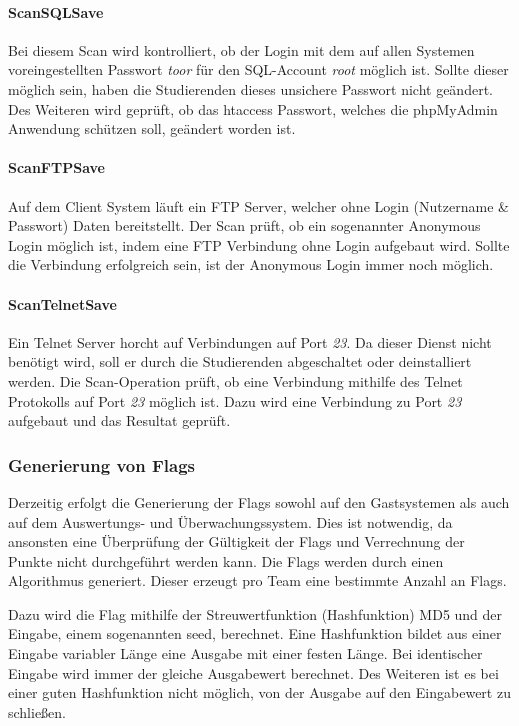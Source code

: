 \paragraph{ScanSQLSave}\label{para:ScanSQLSave}
Bei diesem Scan wird kontrolliert, ob der Login mit dem auf allen Systemen voreingestellten Passwort \textit{toor} für den SQL-Account \textit{root} möglich ist. Sollte dieser möglich sein, haben die Studierenden dieses unsichere Passwort nicht geändert. Des Weiteren wird geprüft, ob das htaccess Passwort, welches die phpMyAdmin Anwendung schützen soll, geändert worden ist.

\paragraph{ScanFTPSave}\label{para:ScanFTPSave}
Auf dem Client System läuft ein FTP Server, welcher ohne Login (Nutzername \& Passwort) Daten bereitstellt. Der Scan prüft, ob ein sogenannter Anonymous Login möglich ist, indem eine FTP Verbindung ohne Login aufgebaut wird. Sollte die Verbindung erfolgreich sein, ist der Anonymous Login immer noch möglich.

\paragraph{ScanTelnetSave}\label{para:ScanTelnetSave}
Ein Telnet Server horcht auf Verbindungen auf Port \textit{23}. Da dieser Dienst nicht benötigt wird, soll er durch die Studierenden abgeschaltet oder deinstalliert werden. Die Scan-Operation prüft, ob eine Verbindung mithilfe des Telnet Protokolls auf Port \textit{23} möglich ist. Dazu wird eine Verbindung zu Port \textit{23} aufgebaut und das Resultat geprüft.

\subsubsection{Generierung von Flags}\label{subsubsec:Generierung_von_Flags}

Derzeitig erfolgt die Generierung der Flags sowohl auf den Gastsystemen als auch auf dem Auswertungs- und Überwachungssystem. Dies ist notwendig, da ansonsten eine Überprüfung der Gültigkeit der Flags und Verrechnung der Punkte nicht durchgeführt werden kann. Die Flags werden durch einen Algorithmus generiert. Dieser erzeugt pro Team eine bestimmte Anzahl an Flags. 

Dazu wird die Flag mithilfe der Streuwertfunktion (Hashfunktion) MD5 und der Eingabe, einem sogenannten seed, berechnet. Eine Hashfunktion bildet aus einer Eingabe variabler Länge eine Ausgabe mit einer festen Länge. Bei identischer Eingabe wird immer der gleiche Ausgabewert berechnet. Des Weiteren ist es bei einer guten Hashfunktion nicht möglich, von der Ausgabe auf den Eingabewert zu schließen.\cite{menezesHandbookAppliedCryptography1996}

